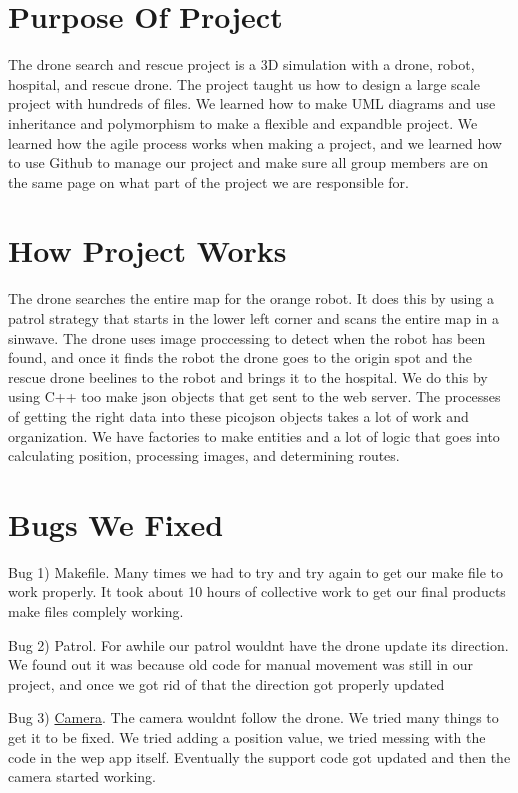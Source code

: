 \hypertarget{overview_purpose_of_project}{}\section{Purpose Of Project}\label{overview_purpose_of_project}
The drone search and rescue project is a 3D simulation with a drone, robot, hospital, and rescue drone. The project taught us how to design a large scale project with hundreds of files. We learned how to make U\+ML diagrams and use inheritance and polymorphism to make a flexible and expandble project. We learned how the agile process works when making a project, and we learned how to use Github to manage our project and make sure all group members are on the same page on what part of the project we are responsible for.\hypertarget{overview_how_project_works}{}\section{How Project Works}\label{overview_how_project_works}
The drone searches the entire map for the orange robot. It does this by using a patrol strategy that starts in the lower left corner and scans the entire map in a sinwave. The drone uses image proccessing to detect when the robot has been found, and once it finds the robot the drone goes to the origin spot and the rescue drone beelines to the robot and brings it to the hospital. We do this by using C++ too make json objects that get sent to the web server. The processes of getting the right data into these picojson objects takes a lot of work and organization. We have factories to make entities and a lot of logic that goes into calculating position, processing images, and determining routes.\hypertarget{overview_bugs_we_fixed}{}\section{Bugs We Fixed}\label{overview_bugs_we_fixed}
Bug 1) Makefile. Many times we had to try and try again to get our make file to work properly. It took about 10 hours of collective work to get our final products make files complely working.

Bug 2) Patrol. For awhile our patrol wouldn\textquotesingle{}t have the drone update its direction. We found out it was because old code for manual movement was still in our project, and once we got rid of that the direction got properly updated

Bug 3) \hyperlink{classCamera}{Camera}. The camera wouldn\textquotesingle{}t follow the drone. We tried many things to get it to be fixed. We tried adding a position value, we tried messing with the code in the wep app itself. Eventually the support code got updated and then the camera started working.

